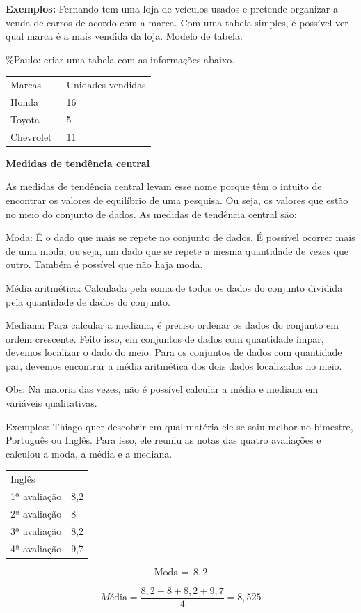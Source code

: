 \textbf{Exemplos:} Fernando tem uma loja de veículos usados e pretende
organizar a venda de carros de acordo com a marca. Com uma tabela
simples, é possível ver qual marca é a mais vendida da loja. Modelo de
tabela:

\%Paulo: criar uma tabela com as informações abaixo.

\begin{longtable}[]{@{}ll@{}}
\toprule
\endhead
Marcas & Unidades vendidas\tabularnewline
Honda & 16\tabularnewline
Toyota & 5\tabularnewline
Chevrolet~ & 11\tabularnewline
\bottomrule
\end{longtable}

\textbf{Medidas de tendência central}

As medidas de tendência central levam esse nome porque têm o intuito de
encontrar os valores de equilíbrio de uma pesquisa. Ou seja, os valores
que estão no meio do conjunto de dados. As medidas de tendência central
são:

Moda: É o dado que mais se repete no conjunto de dados. É possível
ocorrer mais de uma moda, ou seja, um dado que se repete a mesma
quantidade de vezes que outro. Também é possível que não haja moda.

Média aritmética: Calculada pela soma de todos os dados do conjunto
dividida pela quantidade de dados do conjunto.

Mediana: Para calcular a mediana, é preciso ordenar os dados do conjunto
em ordem crescente. Feito isso, em conjuntos de dados com quantidade
ímpar, devemos localizar o dado do meio. Para os conjuntos de dados com
quantidade par, devemos encontrar a média aritmética dos dois dados
localizados no meio.

Obs: Na maioria das vezes, não é possível calcular a média e mediana em
variáveis qualitativas.

Exemplos: Thiago quer descobrir em qual matéria ele se saiu melhor no
bimestre, Português ou Inglês. Para isso, ele reuniu as notas das quatro
avaliações e calculou a moda, a média e a mediana.

\begin{longtable}[]{@{}ll@{}}
\toprule
\endhead
Inglês &\tabularnewline
1ª avaliação & 8,2\tabularnewline
2ª avaliação & 8\tabularnewline
3ª avaliação & 8,2\tabularnewline
4ª avaliação & 9,7\tabularnewline
\bottomrule
\end{longtable}

\[\text{Moda} = \ 8,2\]

\[Mé\text{dia} = \frac{8,2 + 8 + 8,2 + 9,7}{4} = 8,525\]

